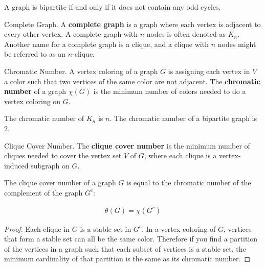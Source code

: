 \begin{nonumtheorem}
    \label{thm:bipartite-odd}
    A graph is bipartite if and only if it does not contain any odd cycles.
\end{nonumtheorem}

\begin{definition}{Complete Graph.}
    \label{defn:clique}
    A \textbf{complete graph} is a graph where each vertex is adjacent to every other vertex. A complete graph with $n$ nodes is often denoted as $K_n$. Another name for a complete graph is a clique, and a clique with $n$ nodes might be referred to as an $n$-clique.
\end{definition}

\begin{definition}{Chromatic Number.}
    \label{defn:colors}
	A vertex coloring of a graph $G$ is assigning each vertex in $V$ a color such that two vertices of the same color are not adjacent. The \textbf{chromatic number} of a graph $\chi(G)$ is the minimum number of colors needed to do a vertex coloring on $G$.
\end{definition}

\begin{remark}
    The chromatic number of $K_n$ is $n$. The chromatic number of a bipartite graph is $2$.
\end{remark}

\begin{definition}{Clique Cover Number.}
    \label{defn:clique-cover-num}
    The \textbf{clique cover number} is the minimum number of cliques needed to cover the vertex set $V$ of $G$, where each clique is a vertex-induced subgraph on $G$.
\end{definition}

\begin{proposition}
    \label{prop:chrom-clique}
    The clique cover number of a graph $G$ is equal to the chromatic number of the complement of the graph $G^c$:
    
    \begin{align}
        \theta(G) = \chi(G^c)
    \end{align}
\end{proposition}

\begin{proof}
    Each clique in $G$ is a stable set in $G^c$. In a vertex coloring of $G$, vertices that form a stable set can all be the same color. Therefore if you find a partition of the vertices in a graph such that each subset of vertices is a stable set, the minimum cardinality of that partition is the same as its chromatic number.
\end{proof}

